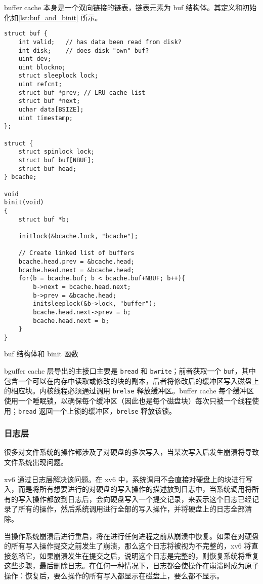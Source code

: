 buffer cache 本身是一个双向链接的链表，链表元素为 buf 结构体。其定义和初始化如\cref{lst:buf_and_binit} 所示。

\begin{listing}[!htb]
	\begin{verbatim}
struct buf {
    int valid;   // has data been read from disk?
    int disk;    // does disk "own" buf?
    uint dev;
    uint blockno;
    struct sleeplock lock;
    uint refcnt;
    struct buf *prev; // LRU cache list
    struct buf *next;
    uchar data[BSIZE];
    uint timestamp;
};

struct {
    struct spinlock lock;
    struct buf buf[NBUF];
    struct buf head;
} bcache;

void
binit(void)
{
    struct buf *b;

    initlock(&bcache.lock, "bcache");

    // Create linked list of buffers
    bcache.head.prev = &bcache.head;
    bcache.head.next = &bcache.head;
    for(b = bcache.buf; b < bcache.buf+NBUF; b++){
        b->next = bcache.head.next;
        b->prev = &bcache.head;
        initsleeplock(&b->lock, "buffer");
        bcache.head.next->prev = b;
        bcache.head.next = b;
    }
}
	\end{verbatim}
	\caption{buf 结构体和 binit 函数}\label{lst:buf_and_binit}
\end{listing}

bguffer cache 层导出的主接口主要是 \texttt{bread} 和 \texttt{bwrite}；前者获取一个 \texttt{buf}，其中包含一个可以在内存中读取或修改的块的副本，后者将修改后的缓冲区写入磁盘上的相应块。内核线程必须通过调用 \texttt{brelse} 释放缓冲区。buffer cache 每个缓冲区使用一个睡眠锁，以确保每个缓冲区（因此也是每个磁盘块）每次只被一个线程使用；\texttt{bread} 返回一个上锁的缓冲区，\texttt{brelse} 释放该锁。

\subsubsection{日志层}

很多对文件系统的操作都涉及了对硬盘的多次写入，当某次写入后发生崩溃将导致文件系统出现问题。

xv6 通过日志层解决该问题。在 xv6 中，系统调用不会直接对硬盘上的块进行写入，而是将所有想要进行的对硬盘的写入操作的描述放到日志中，当系统调用将所有的写入操作都放到日志后，会向硬盘写入一个提交记录，来表示这个日志已经记录了所有的操作，然后系统调用进行全部的写入操作，并将硬盘上的日志全部清除。

当操作系统崩溃后进行重启，将在进行任何进程之前从崩溃中恢复。如果在对硬盘的所有写入操作提交之前发生了崩溃，那么这个日志将被视为不完整的，xv6 将直接忽略它，如果崩溃发生在提交之后，说明这个日志是完整的，则恢复系统将重复这些步骤，最后删除日志。在任何一种情况下，日志都会使操作在崩溃时成为原子操作：恢复后，要么操作的所有写入都显示在磁盘上，要么都不显示。

